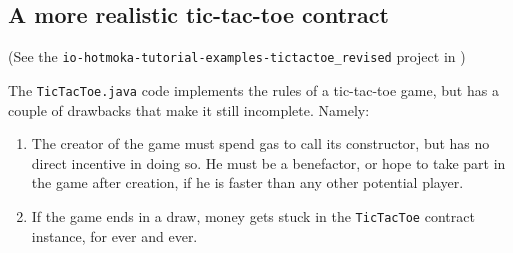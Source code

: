 \subsection{A more realistic tic-tac-toe contract}\label{subsec:more_realistic_tictactoe}

\begin{center}
(See the \texttt{io-hotmoka-tutorial-examples-tictactoe\_revised} project in \hotmokaRepo{})
\end{center}

The \texttt{TicTacToe.java} code implements the rules of a tic-tac-toe game, but has
a couple of drawbacks that make it still incomplete. Namely:
%
\begin{enumerate}
\item The creator of the game must spend gas to call its constructor,
  but has no direct incentive in doing so. He must be a benefactor,
  or hope to take part in the game after creation, if he is faster than
  any other potential player.
\item If the game ends in a draw, money gets stuck in the \texttt{TicTacToe} contract
  instance, for ever and ever.
\end{enumerate}

